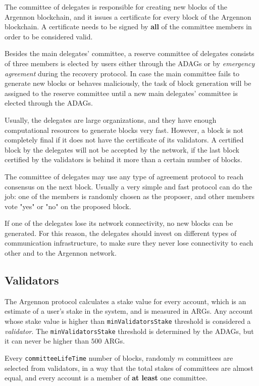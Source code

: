 The committee of delegates is responsible for creating new blocks of the Argennon blockchain, and it issues a
certificate for every block of the Argennon blockchain. A certificate needs to be signed
by \textbf{all} of the committee members in order to be considered valid.

Besides the main delegates' committee, a reserve committee of delegates consists of three members is elected by users
either through the ADAGs or by \emph{emergency agreement} during the recovery protocol. In case the main committee
fails to generate new blocks or behaves maliciously, the task of
block generation will be assigned to the reserve committee until a new main delegates' committee is elected
through the ADAGs.

Usually, the delegates are large organizations, and they have enough computational resources to generate blocks
very fast. However, a block is not completely final if it does not have the certificate of its validators.
A certified block by the delegates will not be accepted by the network, if the last block certified by
the validators is behind it more than a certain number of blocks.

The committee of delegates may use any type of agreement protocol to reach consensus on the
next block. Usually a very simple and fast protocol can do the job: one of the members
is randomly chosen as the proposer, and other members vote "yes" or "no" on the proposed block.

If one of the delegates lose its network connectivity, no new blocks can be generated. For this reason,
the delegates should invest on different types of communication infrastructure, to make sure they never lose
connectivity to each other and to the Argennon network.

\subsection{Validators}\label{subsec:validators-committee}

The Argennon protocol calculates a stake value for every account, which is an estimate of a user's stake in the
system, and is measured in ARGs. Any account whose stake value is higher than
\texttt{minValidatorsStake} threshold is considered a \emph{validator}.
The \texttt{minValidatorsStake}
threshold is determined by the ADAGs, but it can never be higher than $500$ ARGs.

Every \texttt{committeeLifeTime} number of blocks, randomly $m$ committees are selected from
validators, in a way that the total stakes of committees are almost equal, and every
account is a member of \textbf{at least} one committee.


